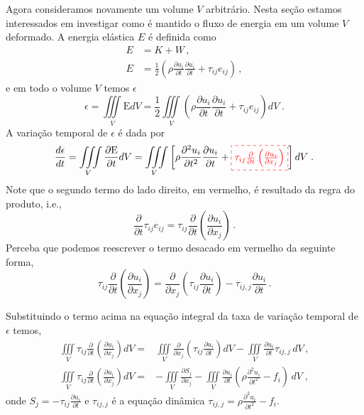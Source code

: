 Agora consideramos novamente um volume $V$ arbitr\'ario. Nesta
se\c{c}\~ao estamos interessados em investigar como \'e mantido o
fluxo de energia  em um volume $V$ deformado. A energia el\'astica $E$ \'e
definida como
\begin{align}
  E &= K + W \, ,\\
  E &= \frac{1}{2}\left(\rho\frac{\partial u_i}{\partial t}\frac{\partial u_i}{\partial t} +
  \tau_{ij}e_{ij} \right)\, ,
\end{align}
e em todo o volume $V$ temos $\epsilon$
\begin{equation}
\epsilon=\iiint\limits_{V}\mbox{E}dV=\frac{1}{2}\iiint\limits_{V}\left(
\rho\frac{\partial u_{i}}{\partial t}\frac{\partial u_{i}}{\partial t}+\tau_{ij}e_{ij}\right)dV \;.
\end{equation}
A varia\c{c}\~ao temporal de $\epsilon$ \'e dada por
\begin{equation}
\frac{d\epsilon}{dt}=\iiint\limits_{V}\frac{\partial \mbox{E}}{\partial t}dV=
\iiint\limits_{V} \left[\rho\frac{\partial^{2}
  u_{i}}{\partial t^{2}} \frac{\partial u_{i}}{\partial t}+\mathboxed{\tau_{ij}
\frac{\partial}{\partial t}\left(\frac{\partial u_{i}}{\partial
  x_{j}}\right)}\right]dV \;.
\end{equation}
Note que o segundo termo do lado direito, em vermelho, \'e resultado da regra do
produto, i.e.,
\begin{equation}
  \frac{\partial}{\partial t}\tau_{ij}e_{ij} = \tau_{ij} 
  \frac{\partial}{\partial t}\left(\frac{\partial u_{i}}{\partial x_{j}}\right)
  \, .
\end{equation}
Perceba que podemos reescrever o termo desacado em vermelho da seguinte forma,
\begin{equation}
  \tau_{ij}\frac{\partial}{\partial t}
  \left(\frac{\partial u_{i}}{\partial x_{j}}\right) = 
  \frac{\partial}{\partial x_j}\left(\tau_{ij}\frac{\partial u_i}{\partial t}\right)-
  \tau_{ij,j}\frac{\partial u_i}{\partial t} \, .
\end{equation}

Substituindo o termo acima na equa\c{c}\~ao integral da taxa de varia\c{c}\~ao
temporal de $\epsilon$ temos,
\begin{align}
\iiint\limits_{V}\tau_{ij}
\frac{\partial}{\partial t}\left(\frac{\partial u_{i}}{\partial
x_{j}}\right)dV=
&\iiint\limits_{V}
\frac{\partial}{\partial x_{j}}\left(\tau_{ij}\frac{\partial
u_{i}}{\partial t}\right)dV- \iiint\limits_{V}
\frac{\partial u_{i}}{\partial t} \tau_{ij,j}\,dV \, ,\\
\iiint\limits_{V}\tau_{ij}
\frac{\partial}{\partial t}\left(\frac{\partial u_{i}}{\partial
x_{j}}\right)dV =&-\iiint\limits_{V}\frac{\partial S_{j}}{\partial x_{j}}-
\iiint\limits_{V}\frac{\partial u_{i}}{\partial
t}\left(\rho\frac{\partial^{2} u_{i}}{\partial
t^{2}}-f_{i}\right)\,dV \;,
\end{align}
onde $S_{j}=-\tau_{ij}\frac{\partial
u_{i}}{\partial t}$ e $\tau_{ij,j}$ \'e a equa\c{c}\~ao din\^amica $\tau_{ij,j}=\rho
\frac{\partial^{2} u_{i}}{\partial t^{2}}-f_{i}$.

